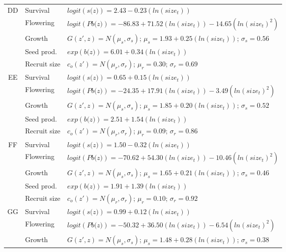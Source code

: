 \documentclass[12pt, letterpaper]{article}
\begin{document}
\begin{spacing}{1.3}
\begin{longtable}[ht!]{c|l|p{}}
         \hline
         DD  &  Survival  &  $logit(\textit{s(z)})= 2.43-0.23(ln(size_t))$ \\
         \rowcolor[gray]{.95}& Flowering  & $logit(\textit{Pb(z)})  = -86.83 + 71.52(ln(size_t)) -14.65(ln(size_t)^2)$ \\
         & Growth  &  $G(z',z) = N(\mu_s, \sigma_s)$; $\mu_s = 1.93 + 0.25(ln(size_t))$; $\sigma_s = 0.56$\\
         \rowcolor[gray]{.95}& Seed prod.  & $exp(\textit{b(z)}) = 6.01 + 0.34(ln(size_t))$  \\
         & Recruit size  &  $c_o(z') = N(\mu_r, \sigma_r)$; $\mu_r = 0.30$; $\sigma_r = 0.69$ \\
         \hline
         \rowcolor[gray]{.95}EE  &  Survival  &  $logit(\textit{s(z)})= 0.65+0.15(ln(size_t))$ \\
         & Flowering  & $logit(\textit{Pb(z)})  = -24.35 + 17.91(ln(size_t)) -3.49(ln(size_t)^2)$ \\
         \rowcolor[gray]{.95}& Growth  &  $G(z',z) = N(\mu_s, \sigma_s)$; $\mu_s = 1.85 + 0.20(ln(size_t))$; $\sigma_s = 0.52$\\
         & Seed prod.  & $exp(\textit{b(z)}) = 2.51 + 1.54(ln(size_t))$  \\
         \rowcolor[gray]{.95}& Recruit size  &  $c_o(z') = N(\mu_r, \sigma_r)$; $\mu_r = 0.09$; $\sigma_r = 0.86$ \\
         \hline
         FF  &  Survival  &  $logit(\textit{s(z)})= 1.50-0.32(ln(size_t))$ \\
         \rowcolor[gray]{.95}& Flowering  & $logit(\textit{Pb(z)})  = -70.62 + 54.30(ln(size_t)) -10.46(ln(size_t)^2)$ \\
         & Growth  &  $G(z',z) = N(\mu_s, \sigma_s)$; $\mu_s = 1.65 + 0.21(ln(size_t))$; $\sigma_s = 0.46$\\
         \rowcolor[gray]{.95}& Seed prod.  & $exp(\textit{b(z)}) = 1.91 + 1.39(ln(size_t))$  \\
         & Recruit size  &  $c_o(z') = N(\mu_r, \sigma_r)$; $\mu_r = 0.10$; $\sigma_r = 0.92$ \\
        \hline
         \rowcolor[gray]{.95}GG  &  Survival  &  $logit(\textit{s(z)})= 0.99+0.12(ln(size_t))$ \\
         & Flowering  & $logit(\textit{Pb(z)})  = -50.32 + 36.50(ln(size_t)) -6.54(ln(size_t)^2)$ \\
         \rowcolor[gray]{.95}& Growth  &  $G(z',z) = N(\mu_s, \sigma_s)$; $\mu_s = 1.48 + 0.28(ln(size_t))$; $\sigma_s = 0.38$\\

\end{longtable}
\end{spacing}
\end{document}
